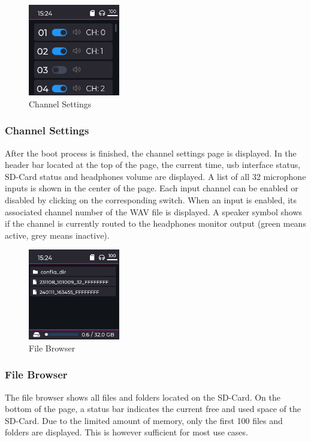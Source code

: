 \begin{minipage}{\linewidth}
	\begin{figure}
		\vspace{-0.6cm}
		\includegraphics[width=4cm]{images/4_design_acquisition_system/gui/03_channel_settings.png}
		\centering
		\caption{Channel Settings}
		\label{fig:acquisition_system_gui_channel_settings}
	\end{figure}
	\subsubsection{Channel Settings}
	After the boot process is finished, the channel settings page is displayed.
	In the header bar located at the top of the page, the current time, \acrshort{usb} interface status, SD-Card status and headphones volume are displayed.
	A list of all 32 microphone inputs is shown in the center of the page.
	Each input channel can be enabled or disabled by clicking on the corresponding switch.
	When an input is enabled, its associated channel number of the WAV file is displayed.
	A speaker symbol shows if the channel is currently routed to the headphones monitor output (green means active, grey means inactive).
\end{minipage}
\vspace{0.0cm}

\begin{minipage}{\linewidth}
	\begin{figure}
		\vspace{-0.6cm}
		\includegraphics[width=4cm]{images/4_design_acquisition_system/gui/02_file_browser.png}
		\centering
		\caption{File Browser}
		\label{fig:acquisition_system_gui_file_browser}
	\end{figure}
	\subsubsection{File Browser}
	The file browser shows all files and folders located on the SD-Card.
	On the bottom of the page, a status bar indicates the current free and used space of the SD-Card.
	Due to the limited amount of memory, only the first 100 files and folders are displayed.
	This is however sufficient for most use cases.
\end{minipage}
\vspace{1.8cm}

